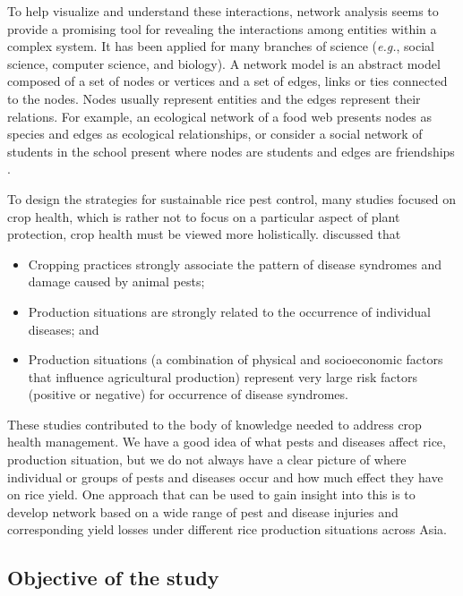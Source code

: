 To help visualize and understand these interactions, network analysis seems to provide a promising tool for revealing the interactions among entities within a complex system. It has been applied for many branches of science (\textit{e.g.}, social science, computer science, and biology). A network model is an abstract model composed of a set of nodes or vertices and a set of edges, links or ties connected to the nodes. Nodes usually represent entities and the edges represent their relations. For example, an ecological network of a food web presents nodes as species \citep{krause2003compartments} and edges as ecological relationships, or consider a social network of students in the school present where nodes are students and edges are friendships \citep{moody2001race}.

To design the strategies for sustainable  rice pest control, many studies focused on crop health, which is rather not to focus on a particular aspect of plant protection, crop health must be viewed more holistically. \cite{Savary_1995_Use, Savary_2000_Quantification, Savary_2005_Multiple} discussed that

\begin{itemize}
\item Cropping practices strongly associate the pattern of disease syndromes and damage caused by animal pests;
\item Production situations are strongly related to the occurrence of  individual diseases; and
\item Production situations (a combination of physical and socioeconomic factors that influence agricultural production) represent very large risk factors (positive or negative) for occurrence of disease syndromes. 
\end{itemize}
 
These studies contributed to the body of knowledge needed to address crop health management. We have a good idea of what pests and diseases affect rice, production situation, but we do not always have a clear picture of where individual or groups of pests and diseases occur and how much effect they have on rice yield. One approach that can be used to gain insight into this is to develop network based on a wide range of pest and disease injuries and corresponding yield losses under different rice production situations across Asia. 

\subsection{Objective of the study}

